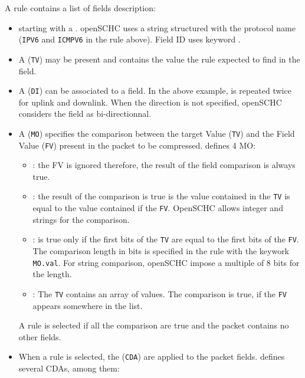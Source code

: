 A rule contains a list of fields description:
\begin{itemize}
    \item starting with a . openSCHC uses a string structured with the protocol name (\texttt{IPV6} and \texttt{ICMPV6} in the rule above). Field ID uses keyword \texttt{}.

    \item A  (\texttt{TV}) may be present and contains the value the rule expected to find in the field.

    \item A  (\texttt{DI}) can be associated to a field. In the above example,  is repeated twice for uplink and downlink. When the direction is not specified, openSCHC considers the field as bi-directionnal.

    \item A  (\texttt{MO}) specifies the comparison between the target Value  (\texttt{TV}) and the Field Value (\texttt{FV}) present in the packet to be compressed.  defines 4 MO:

    \begin{itemize}
    \item \texttt{}: the FV is ignored therefore, the result of the field comparison is always true.
    \item \texttt{}: the result of the comparison is true is the value contained in the \texttt{TV} is equal to the value contained if the \texttt{FV}. OpenSCHC allows integer and strings for the comparison.
    \item \texttt{}: is true only if the first bits of the \texttt{TV} are equal to the first bits of the \texttt{FV}. The comparison length in bits is specified in the rule with the keywork \texttt{MO.val}. For string comparison, openSCHC impose a  multiple of 8 bits for the length.
    \item \texttt{}: The \texttt{TV} contains an array of values. The comparison is true, if the \texttt{FV} appears somewhere in the list.
    \end{itemize}

    A rule is selected if all the comparison are true and the packet contains no other fields. 


    \item When a rule is selected, the  (\texttt{CDA}) are applied to the packet fields.  defines several CDAs, among them:


\end{itemize}
